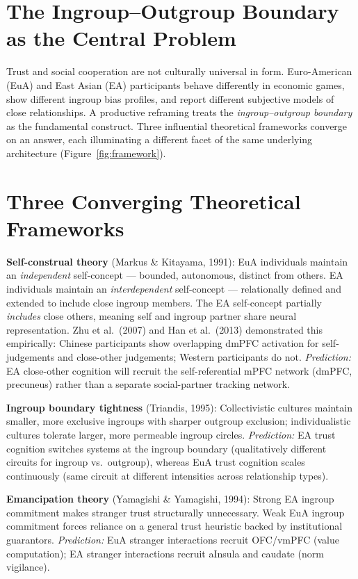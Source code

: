 \documentclass[11pt,a4paper]{report}
\begin{document}
\section*{The Ingroup--Outgroup Boundary as the Central Problem}

Trust and social cooperation are not culturally universal in form. Euro-American (EuA) and
East Asian (EA) participants behave differently in economic games, show different ingroup bias
profiles, and report different subjective models of close relationships. A productive reframing
treats the \emph{ingroup--outgroup boundary} as the fundamental construct. Three influential
theoretical frameworks converge on an answer, each illuminating a different facet of the same
underlying architecture (Figure~\ref{fig:framework}).

\section*{Three Converging Theoretical Frameworks}

\textbf{Self-construal theory} (Markus \& Kitayama, 1991): EuA individuals maintain an
\emph{independent} self-concept --- bounded, autonomous, distinct from others. EA individuals
maintain an \emph{interdependent} self-concept --- relationally defined and extended to include
close ingroup members. The EA self-concept partially \emph{includes} close others, meaning
self and ingroup partner share neural representation. Zhu et al.\ (2007) and Han et al.\
(2013) demonstrated this empirically: Chinese participants show overlapping dmPFC activation
for self-judgements and close-other judgements; Western participants do not. \textit{Prediction:}
EA close-other cognition will recruit the self-referential mPFC network (dmPFC, precuneus)
rather than a separate social-partner tracking network.

\textbf{Ingroup boundary tightness} (Triandis, 1995): Collectivistic cultures maintain
smaller, more exclusive ingroups with sharper outgroup exclusion; individualistic cultures
tolerate larger, more permeable ingroup circles. \textit{Prediction:} EA trust cognition
switches systems at the ingroup boundary (qualitatively different circuits for ingroup
vs.\ outgroup), whereas EuA trust cognition scales continuously (same circuit at different
intensities across relationship types).

\textbf{Emancipation theory} (Yamagishi \& Yamagishi, 1994): Strong EA ingroup commitment
makes stranger trust structurally unnecessary. Weak EuA ingroup commitment forces reliance
on a general trust heuristic backed by institutional guarantors. \textit{Prediction:} EuA
stranger interactions recruit OFC/vmPFC (value computation); EA stranger interactions recruit
aInsula and caudate (norm vigilance).
\end{document}
